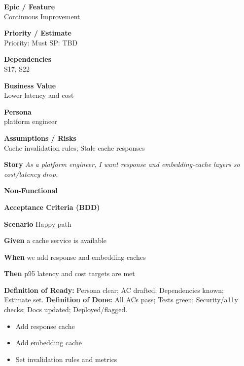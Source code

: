 \documentclass[11pt,a4paper]{article}
\newenvironment{StoryCard}[2][]{
  \begin{tcolorbox}[enhanced, breakable, sharp corners=all, colback=cardback, colframe=cardframe,
    title={#2}, fonttitle=\bfseries\large, boxrule=0.6pt, borderline west={2pt}{0pt}{accent}, #1]
}{
  \end{tcolorbox}
}
\newcommand{\badge}[1]{\pill{\footnotesize #1}}
\newcommand{\cb}{\(\square\)}
\newenvironment{TasksBox}[1][Tasks]{%
  \begin{tcolorbox}[enhanced,breakable,
    colback=cardback, colframe=cardframe, title={#1},
    borderline west={1.8pt}{0pt}{MidnightBlue},
    arc=2pt, boxrule=0.4pt,
    left=10pt,right=10pt,top=6pt,bottom=6pt,
    before skip=6pt, after skip=10pt
  ]
  \small
  \begin{itemize}[label=\cb, leftmargin=*, labelsep=0.6em, itemsep=4pt, topsep=2pt, parsep=0pt]
}{%
  \end{itemize}
  \end{tcolorbox}
}
\begin{document}
\begin{StoryCard}{S31 — Caching \& retrieval optimization}
\noindent\begin{minipage}[t]{0.49\textwidth}
\textbf{Epic / Feature}\\
Continuous Improvement

\medskip
\textbf{Priority / Estimate}\\
Priority: Must \quad SP: TBD

\medskip
\textbf{Dependencies}\\
S17, S22
\end{minipage}\hfill
\begin{minipage}[t]{0.49\textwidth}
\textbf{Business Value}\\
Lower latency and cost

\medskip
\textbf{Persona}\\
platform engineer

\medskip
\textbf{Assumptions / Risks}\\
Cache invalidation rules; Stale cache responses
\end{minipage}

\medskip
\textbf{Story} \emph{As a platform engineer, I want response and embedding-cache layers so cost/latency drop.}

\medskip
\textbf{Non-Functional}
\badge{Performance}\ \badge{Cost}

\medskip
\textbf{Acceptance Criteria (BDD)}\par
\textbf{Scenario} Happy path\par
\textbf{Given} a cache service is available\par
\textbf{When} we add response and embedding caches\par
\textbf{Then} p95 latency and cost targets are met\par
\medskip
\footnotesize \textbf{Definition of Ready:} Persona clear; AC drafted; Dependencies known; Estimate set.\quad
\textbf{Definition of Done:} All ACs pass; Tests green; Security/a11y checks; Docs updated; Deployed/flagged.
\end{StoryCard}

\begin{TasksBox}[Tasks]
  \item Add response cache
  \item Add embedding cache
  \item Set invalidation rules and metrics
\end{TasksBox}
\clearpage
\end{document}
